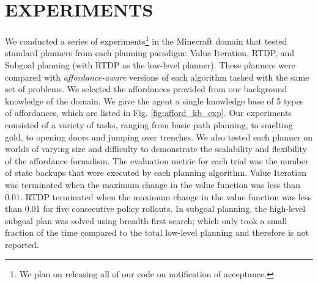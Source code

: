 \documentclass[]{article}
\newcommand{\stnote}[1]{\textcolor{Blue}{\textbf{ST: #1}}}
\newcommand{\jmnote}[1]{\textcolor{Green}{\textbf{JM: #1}}}
\begin{document}




\section{EXPERIMENTS}

%


We conducted a series of experiments\footnote{We plan on releasing all of our code on notification of acceptance.} in the Minecraft domain that
tested standard planners from each planning paradigm: Value Iteration,
RTDP, and Subgoal planning (with RTDP as the low-level planner). These
planners were compared with {\it affordance-aware} versions of each
algorithm tasked with the same set of problems. We selected the
affordances provided from our background knowledge of the domain.  We gave the agent a single knowledge base of 5 types of affordances, which are listed in Fig. \ref{fig:afford_kb_exp}.
Our experiments consisted of a variety of tasks, ranging from basic path planning, to smelting gold,
to opening doors and jumping over trenches.  We also tested each
planner on worlds of varying size and difficulty to demonstrate the
scalability and flexibility of the affordance formalism. The
evaluation metric for each trial was the number of state backups that
were executed by each planning algorithm. Value
Iteration was terminated when the maximum change in the value function
was less than 0.01. RTDP terminated when the maximum change in the
value function was less than 0.01 for five consecutive policy
rollouts. In subgoal planning, the high-level subgoal plan was solved
using breadth-first search; which only took a small fraction of the
time compared to the total low-level planning and therefore is not
reported.
\end{document}
